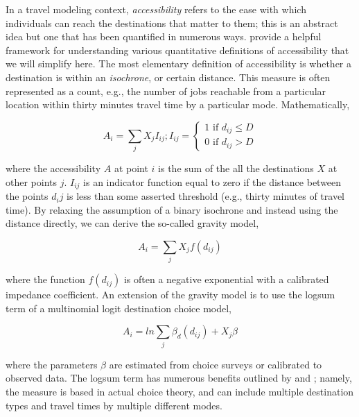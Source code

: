 \documentclass[3p, authoryear]{elsarticle} %
\begin{document}
In a travel modeling context, \emph{accessibility} refers to the ease with which
individuals can reach the destinations that matter to them; this is an abstract
idea but one that has been quantified in numerous ways. \citet{dong2006} provide a
helpful framework for understanding various quantitative definitions of
accessibility that we will simplify here. The most elementary definition of
accessibility is whether a destination is within an \emph{isochrone}, or certain
distance. This measure is often represented as a count, e.g., the number of jobs
reachable from a particular location within thirty minutes travel time by a
particular mode. Mathematically,

\begin{equation}
A_i = \sum_{j} X_j I_{ij};  I_{ij} = \begin{cases}  1 \text{ if } d_{ij} \leq D\\ 
0 \text{ if } d_{ij} > D \end{cases}
  \label{eq:isochrone}
\end{equation}

where the accessibility \(A\) at point \(i\) is the sum of the all the
destinations \(X\) at other points \(j\). \(I_{ij}\) is an indicator function equal to
zero if the distance between the points \(d{_ij}\) is less than some asserted
threshold (e.g., thirty minutes of travel time). By relaxing the assumption of a
binary isochrone and instead using the distance directly, we can derive the
so-called gravity model,

\begin{equation}
A_i = \sum_{j} X_j f(d_{ij})
  \label{eq:gravity}
\end{equation}

where the function \(f(d_{ij})\) is often a negative exponential with a calibrated
impedance coefficient. An extension of the gravity model is to use the logsum
term of a multinomial logit destination choice model,

\begin{equation}
A_i = ln\sum_{j} \beta_d(d_{ij}) + X_j\beta
  \label{eq:logsum}
\end{equation}

where the parameters \(\beta\) are estimated from choice surveys or calibrated to
observed data. The logsum term has numerous benefits outlined by \citet{handy1997}
and \citet{geurs2004}; namely, the measure is based in actual choice theory, and
can include multiple destination types and travel times by multiple different
modes.
\end{document}
